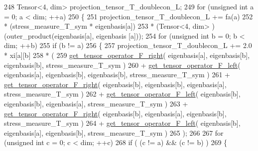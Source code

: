 \begin{DoxyCode}
248          Tensor<4, dim> projection\_tensor\_T\_doublecon\_L;
249          \textcolor{keywordflow}{for} (\textcolor{keywordtype}{unsigned} \textcolor{keywordtype}{int} a = 0; a < dim; ++a)
250          \{
251             projection\_tensor\_T\_doublecon\_L += fa(a)
252                                                * (stress\_measure\_T\_sym * eigenbasis[a])
253                                                * (Tensor<4, dim> ) (outer\_product(eigenbasis[a], eigenbasis
      [a]));
254             \textcolor{keywordflow}{for} (\textcolor{keywordtype}{unsigned} \textcolor{keywordtype}{int} b = 0; b < dim; ++b)
255                 \textcolor{keywordflow}{if} (b != a)
256                 \{
257                     projection\_tensor\_T\_doublecon\_L += 2.0 * xi[a][b]
258                                                        * (
259                                                             
      \hyperlink{functions_8h_acfd8da38df3766246f7bcf0e736ad9f4}{get\_tensor\_operator\_F\_right}( eigenbasis[a], eigenbasis[b], eigenbasis[b], 
      stress\_measure\_T\_sym )
260                                                           + 
      \hyperlink{functions_8h_a6f9435c7728281851248d3537c100e7d}{get\_tensor\_operator\_F\_left}(  eigenbasis[a], eigenbasis[b], eigenbasis[b], 
      stress\_measure\_T\_sym )
261                                                           + 
      \hyperlink{functions_8h_acfd8da38df3766246f7bcf0e736ad9f4}{get\_tensor\_operator\_F\_right}( eigenbasis[b], eigenbasis[b], eigenbasis[a], 
      stress\_measure\_T\_sym )
262                                                           + 
      \hyperlink{functions_8h_a6f9435c7728281851248d3537c100e7d}{get\_tensor\_operator\_F\_left}(  eigenbasis[b], eigenbasis[b], eigenbasis[a], 
      stress\_measure\_T\_sym )
263                                                           + 
      \hyperlink{functions_8h_acfd8da38df3766246f7bcf0e736ad9f4}{get\_tensor\_operator\_F\_right}( eigenbasis[b], eigenbasis[a], eigenbasis[b], 
      stress\_measure\_T\_sym )
264                                                           + 
      \hyperlink{functions_8h_a6f9435c7728281851248d3537c100e7d}{get\_tensor\_operator\_F\_left}(  eigenbasis[b], eigenbasis[a], eigenbasis[b], 
      stress\_measure\_T\_sym )
265                                                          );
266     
267                     \textcolor{keywordflow}{for} (\textcolor{keywordtype}{unsigned} \textcolor{keywordtype}{int} c = 0; c < dim; ++c)
268                         \textcolor{keywordflow}{if} ( (c != a) && (c != b) )
269                         \{

\end{DoxyCode}
